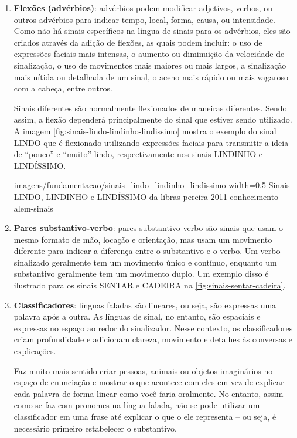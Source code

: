 \begin{enumerate}
    \item \textbf{Flexões (advérbios)}: advérbios podem modificar adjetivos, verbos, ou outros advérbios para indicar tempo, local, forma, causa, ou intensidade. Como não há sinais específicos na língua de sinais para os advérbios, eles são criados através da adição de flexões, as quais podem incluir: o uso de expressões faciais mais intensas, o aumento ou diminuição da velocidade de sinalização, o uso de movimentos mais maiores ou mais largos, a sinalização mais nítida ou detalhada de um sinal, o aceno mais rápido ou mais vagaroso com a cabeça, entre outros.
    
    Sinais diferentes são normalmente flexionados de maneiras diferentes. Sendo assim, a flexão dependerá principalmente do sinal que estiver sendo utilizado. A imagem \autoref{fig:sinais-lindo-lindinho-lindissimo} mostra o exemplo do sinal LINDO que é flexionado utilizando expressões faciais para transmitir a ideia de ``pouco'' e ``muito'' lindo, respectivamente nos sinais LINDINHO e LINDÍSSIMO.
    
        {imagens/fundamentacao/sinais_lindo_lindinho_lindissimo} %
        {width=0.5\linewidth} %
        {Sinais LINDO, LINDINHO e LINDÍSSIMO da \acrshort{libras}} %
        {pereira-2011-conhecimento-alem-sinais} %

    \item \textbf{Pares substantivo-verbo}: pares substantivo-verbo são sinais que usam o mesmo formato de mão, locação e orientação, mas usam um movimento diferente para indicar a diferença entre o substantivo e o verbo. Um verbo sinalizado geralmente tem um movimento único e contínuo, enquanto um substantivo geralmente tem um movimento duplo.  
    Um exemplo disso é ilustrado para os sinais SENTAR e CADEIRA na \autoref{fig:sinais-sentar-cadeira}.
    

    \item \textbf{Classificadores}: línguas faladas são lineares, ou seja, são expressas uma palavra após a outra. As línguas de sinal, no entanto, são espaciais e expressas no espaço ao redor do sinalizador. Nesse contexto, os classificadores criam profundidade e adicionam clareza, movimento e detalhes às conversas e explicações.

    Faz muito mais sentido criar pessoas, animais ou objetos imaginários no espaço de enunciação e mostrar o que acontece com eles em vez de explicar cada palavra de forma linear como você faria oralmente. No entanto, assim como se faz com pronomes na língua falada, não se pode utilizar um classificador em uma frase até explicar o que o ele representa -- ou seja, é necessário primeiro estabelecer o substantivo.


\end{enumerate}
